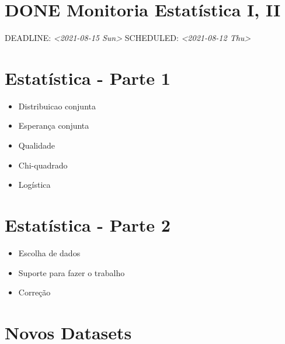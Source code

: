 \documentclass[12pt,a4paper]{article}
\date{\today}
\title{}
\begin{document}
\tableofcontents

\section{{\bfseries\sffamily DONE} Monitoria Estatística I, II}
\label{sec:org0042bf4}
DEADLINE: \textit{<2021-08-15 Sun> } SCHEDULED: \textit{<2021-08-12 Thu>}
\section{Estatística - Parte 1}
\label{sec:orgefc5b03}
\begin{itemize}
\item Distribuicao conjunta
\item Esperança conjunta
\item Qualidade
\item Chi-quadrado
\item Logística
\end{itemize}

\section{Estatística - Parte 2}
\label{sec:orga5e3172}
\begin{itemize}
\item Escolha de dados
\item Suporte para fazer o trabalho
\item Correção
\end{itemize}

\section{Novos Datasets}
\label{sec:orgd552f8b}
\end{document}
